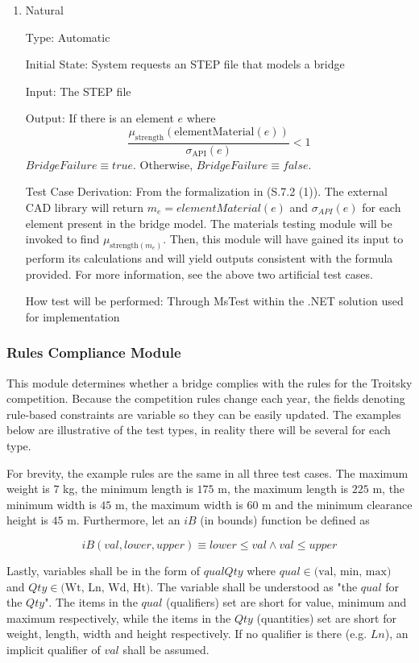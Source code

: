 \documentclass[12pt, titlepage]{article}
\begin{document}
\begin{enumerate}
How test will be performed: Through MsTest within the .NET solution used for implementation
					
\item{Natural}

Type: Automatic
					
Initial State: System requests an STEP file that models a bridge
					
Input: The STEP file
					
Output: If there is an element $e$ where \\ 
\[\frac{\mu_{\text{strength}}(\text{elementMaterial}(e))}{\sigma_{\text{API}}(e)} < 1 \]
$BridgeFailure \equiv true$. Otherwise, $BridgeFailure \equiv false$.

Test Case Derivation: From the formalization in (S.7.2 (1)). The external CAD library will return
$m_e = elementMaterial(e)$ and $\sigma_{API}(e)$ for each element present in the bridge model. The materials testing module
will be invoked to find $\mu_{\text{strength}(m_e)}$. Then, this module will have gained its input to perform its calculations
and will yield outputs consistent with the formula provided. For more information, see the above two artificial test cases. 

How test will be performed: Through MsTest within the .NET solution used for implementation
    
\end{enumerate}

\subsubsection{Rules Compliance Module}

This module determines whether a bridge complies with the rules for the Troitsky competition.
Because the competition rules change each year, the fields denoting rule-based constraints are variable so they
can be easily updated. 
The examples below are illustrative of the test types, in reality
there will be several for each type.

For brevity, the example rules are the same in all three test cases.
The maximum weight is $7$ kg, the minimum length is $175$ m, the maximum length is $225$ m, 
the minimum width is $45$ m, the maximum width is $60$ m and the minimum clearance height is
$45$ m. Furthermore, let an $iB$ (in bounds) function be defined as

\[
  iB(val, lower, upper) \equiv lower \le val \land val \le upper
\]

Lastly, variables shall be in the form of $qualQty$ where $qual \in \text{(val, min, max)}$ and 
$Qty \in \text{(Wt, Ln, Wd, Ht)}$. The variable shall be understood as "the $qual$ for the $Qty$".
The items in the $qual$ (qualifiers) set are short for value, minimum and maximum respectively,
while the items in the $Qty$ (quantities) set are short for weight, length, width and height respectively.
If no qualifier is there (e.g. $Ln$), an implicit qualifier of $val$ shall be assumed.
\end{document}
